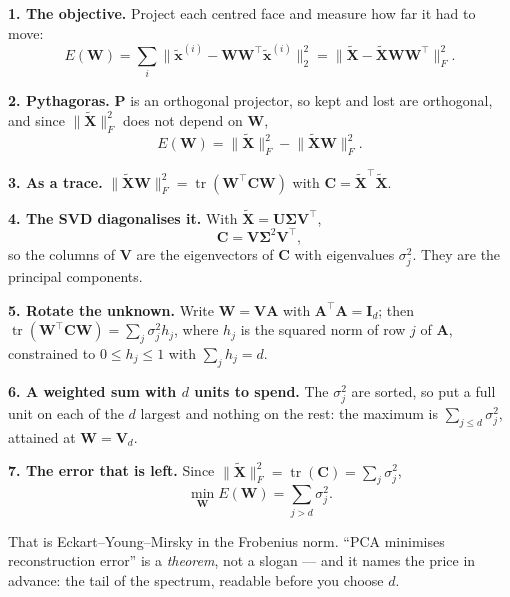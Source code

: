\documentclass[11pt,a4paper]{article}
\begin{document}
\begin{derivbox}[title={Seven steps}]
\textbf{1. The objective.} Project each centred face and measure how far it had
to move:
\[ E(\mathbf{W}) = \sum_i \bigl\lVert\tilde{\mathbf{x}}^{(i)}
   - \mathbf{W}\mathbf{W}^{\intercal}\tilde{\mathbf{x}}^{(i)}\bigr\rVert_2^2
   = \bigl\lVert\tilde{\mathbf{X}}
   - \tilde{\mathbf{X}}\mathbf{W}\mathbf{W}^{\intercal}\bigr\rVert_F^2. \]

\textbf{2. Pythagoras.} $\mathbf{P}$ is an orthogonal projector, so kept and
lost are orthogonal, and since $\lVert\tilde{\mathbf{X}}\rVert_F^2$ does not
depend on $\mathbf{W}$,
\[ E(\mathbf{W}) = \lVert\tilde{\mathbf{X}}\rVert_F^2
                 - \lVert\tilde{\mathbf{X}}\mathbf{W}\rVert_F^2. \]

\textbf{3. As a trace.}
$\lVert\tilde{\mathbf{X}}\mathbf{W}\rVert_F^2
 = \operatorname{tr}(\mathbf{W}^{\intercal}\mathbf{C}\mathbf{W})$ with
$\mathbf{C} = \tilde{\mathbf{X}}^{\intercal}\tilde{\mathbf{X}}$.

\textbf{4. The SVD diagonalises it.} With
$\tilde{\mathbf{X}} = \mathbf{U}\boldsymbol\Sigma\mathbf{V}^{\intercal}$,
\[ \mathbf{C} = \mathbf{V}\boldsymbol\Sigma^2\mathbf{V}^{\intercal}, \]
so the columns of $\mathbf{V}$ are the eigenvectors of $\mathbf{C}$ with
eigenvalues $\sigma_j^2$. They are the principal components.

\textbf{5. Rotate the unknown.} Write $\mathbf{W} = \mathbf{V}\mathbf{A}$ with
$\mathbf{A}^{\intercal}\mathbf{A} = \mathbf{I}_d$; then
$\operatorname{tr}(\mathbf{W}^{\intercal}\mathbf{C}\mathbf{W}) =
 \sum_j \sigma_j^2 h_j$, where $h_j$ is the squared norm of row $j$ of
$\mathbf{A}$, constrained to $0 \le h_j \le 1$ with $\sum_j h_j = d$.

\textbf{6. A weighted sum with $d$ units to spend.} The $\sigma_j^2$ are
sorted, so put a full unit on each of the $d$ largest and nothing on the rest:
the maximum is $\sum_{j\le d}\sigma_j^2$, attained at $\mathbf{W} =
\mathbf{V}_d$.

\textbf{7. The error that is left.} Since
$\lVert\tilde{\mathbf{X}}\rVert_F^2 = \operatorname{tr}(\mathbf{C})
 = \sum_j\sigma_j^2$,
\[ \min_{\mathbf{W}} E(\mathbf{W}) = \sum_{j > d}\sigma_j^{2}. \]
\end{derivbox}

That is Eckart--Young--Mirsky in the Frobenius norm. ``PCA minimises
reconstruction error'' is a \emph{theorem}, not a slogan --- and it names the
price in advance: the tail of the spectrum, readable before you choose $d$.
\end{document}
